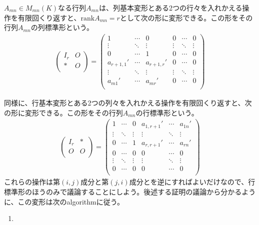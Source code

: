 \documentclass[dvipdfmx]{jsarticle}
\begin{document}
\begin{thm}\label{2.1.7.5}
$A_{mn} \in M_{mn}(K)$なる行列$A_{mn}$は、列基本変形とある2つの行々を入れかえる操作を有限回くり返すと、${\mathrm{rank}}A_{mn} = r$として次の形に変形できる。この形をその行列$A_{mn}$の列標準形という。
\begin{align*}
\begin{pmatrix}
I_{r} & O \\
* & O \\
\end{pmatrix} = \begin{pmatrix}
1 & \cdots & 0 & 0 & \cdots & 0 \\
 \vdots & \ddots & \vdots & \vdots & \ddots & \vdots \\
0 & \cdots & 1 & 0 & \cdots & 0 \\
a_{r + 1,1}' & \cdots & a_{r + 1,r}' & 0 & \cdots & 0 \\
 \vdots & \ddots & \vdots & \vdots & \ddots & \vdots \\
a_{m1}' & \cdots & a_{mr}' & 0 & \cdots & 0 \\
\end{pmatrix}
\end{align*}\par
同様に、行基本変形とある2つの列々を入れかえる操作を有限回くり返すと、次の形に変形できる。この形をその行列$A_{mn}$の行標準形という。
\begin{align*}
\begin{pmatrix}
I_{r} & * \\
O & O \\
\end{pmatrix} = \begin{pmatrix}
1 & \cdots & 0 & a_{1,r + 1}' & \cdots & a_{1n}' \\
 \vdots & \ddots & \vdots & \vdots & \ddots & \vdots \\
0 & \cdots & 1 & a_{r,r + 1}' & \cdots & a_{rn}' \\
0 & \cdots & 0 & 0 & \cdots & 0 \\
 \vdots & \ddots & \vdots & \vdots & \ddots & \vdots \\
0 & \cdots & 0 & 0 & \cdots & 0 \\
\end{pmatrix}
\end{align*}
これらの操作は第$(i,j)$成分と第$(j,i)$成分とを逆にすればよいだけなので、行標準形のほうのみで議論することにしよう。後述する証明の議論から分かるように、この変形は次のalgorithmに従う。
\begin{enumerate}
\item

\end{enumerate}
\end{thm}
\end{document}
